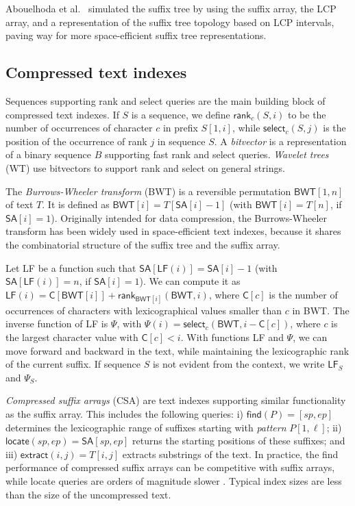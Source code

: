 \documentclass[a4paper,11pt]{llncs}
\newcommand{\SA}{\textsf{SA}}
\newcommand{\BWT}{\textsf{BWT}}
\newcommand{\CSA}{\textsf{CSA}}
\newcommand{\mSA}{\ensuremath{\mathsf{SA}}}
\newcommand{\mBWT}{\ensuremath{\mathsf{BWT}}}
\newcommand{\LCP}{\textsf{LCP}}
\newcommand{\WT}{\textsf{WT}}
\newcommand{\mC}{\ensuremath{\mathsf{C}}}
\newcommand{\LF}{\textsf{LF}}
\newcommand{\find}{\textsf{find}}
\newcommand{\locate}{\textsf{locate}}
\newcommand{\rank}{\textsf{rank}}
\newcommand{\select}{\textsf{select}}
\newcommand{\mLF}{\ensuremath{\mathsf{LF}}}
\newcommand{\mPsi}{\ensuremath{\mathsf{\Psi}}}
\newcommand{\mfind}{\ensuremath{\mathsf{find}}}
\newcommand{\mlocate}{\ensuremath{\mathsf{locate}}}
\newcommand{\mextract}{\ensuremath{\mathsf{extract}}}
\newcommand{\mrank}{\ensuremath{\mathsf{rank}}}
\newcommand{\mselect}{\ensuremath{\mathsf{select}}}
\begin{document}
Abouelhoda et al.~\cite{Abouelhoda2004} simulated the suffix tree by using the suffix array, the \LCP{} array, and a representation of the suffix tree topology based on \LCP{} intervals, paving way for more space-efficient suffix tree representations.

\subsection{Compressed text indexes}

Sequences supporting \rank{} and \select{} queries are the main building block of compressed text indexes. If $S$ is a sequence, we define $\mrank_{c}(S,i)$ to be the number of occurrences of character $c$ in prefix $S[1,i]$, while $\mselect_{c}(S,j)$ is the position of the occurrence of rank $j$ in sequence $S$. A \emph{bitvector} is a representation of a binary sequence $B$ supporting fast \rank{} and \select{} queries. \emph{Wavelet trees} (\WT) \cite{Grossi2003} use bitvectors to support \rank{} and \select{} on general strings.

The \emph{Burrows-Wheeler transform} (\BWT) \cite{Burrows1994} is a reversible permutation $\mBWT[1,n]$ of text $T$. It is defined as $\mBWT[i] = T[\mSA[i] - 1]$ (with $\mBWT[i] = T[n]$, if $\SA[i] = 1$). Originally intended for data compression, the Burrows-Wheeler transform has been widely used in space-efficient text indexes, because it shares the combinatorial structure of the suffix tree and the suffix array.

Let \LF{} be a function such that $\mSA[\mLF(i)] = \mSA[i] - 1$ (with $\mSA[\mLF(i)] = n$, if $\mSA[i] = 1$). We can compute it as $\mLF(i) = \mC[\mBWT[i]] + \mrank_{\mBWT[i]}(\mBWT, i)$, where $\mC[c]$ is the number of occurrences of characters with lexicographical values smaller than $c$ in \BWT. The inverse function of \LF{} is $\mPsi$, with $\mPsi(i) = \mselect_{c}(\mBWT, i - \mC[c])$, where $c$ is the largest character value with $\mC[c] < i$. With functions \LF{} and $\mPsi$, we can move forward and backward in the text, while maintaining the lexicographic rank of the current suffix. If sequence $S$ is not evident from the context, we write $\mLF_{S}$ and $\mPsi_{S}$.

\emph{Compressed suffix arrays} (\CSA) \cite{Ferragina2005a,Grossi2005} are text indexes supporting similar functionality as the suffix array. This includes the following queries: i) $\mfind(P) = [sp,ep]$ determines the lexicographic range of suffixes starting with \emph{pattern} $P[1,\ell]$; ii) $\mlocate(sp,ep) = \mSA[sp,ep]$ returns the starting positions of these suffixes; and iii) $\mextract(i,j) = T[i,j]$ extracts substrings of the text. In practice, the \find{} performance of compressed suffix arrays can be competitive with suffix arrays, while \locate{} queries are orders of magnitude slower \cite{Ferragina2009a}. Typical index sizes are less than the size of the uncompressed text.
\end{document}
